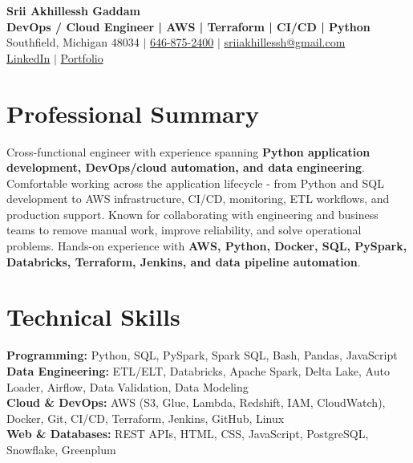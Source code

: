 \documentclass[letterpaper,10pt]{article}
\begin{document}
\fontsize{9.35pt}{10.45pt}\selectfont

\begin{center}
    {\LARGE \textbf{Srii Akhillessh Gaddam}} \\[-1pt]
    \textbf{DevOps / Cloud Engineer | AWS | Terraform | CI/CD | Python} \\[2pt]
    Southfield, Michigan 48034 $|$
    \href{tel:6468752400}{646-875-2400} $|$
    \href{mailto:sriiakhillessh@gmail.com}{sriiakhillessh@gmail.com} \\[1pt]
    \href{https://www.linkedin.com/in/srii-akhiilessh-gaddam-b48668191/}{LinkedIn} $|$
    \href{https://sriiakhillesshg.github.io/portfolio/}{Portfolio}
\end{center}
\vspace{-8pt}

\section{Professional Summary}
\small{Cross-functional engineer with experience spanning \textbf{Python application development, DevOps/cloud automation, and data engineering}. Comfortable working across the application lifecycle - from Python and SQL development to AWS infrastructure, CI/CD, monitoring, ETL workflows, and production support. Known for collaborating with engineering and business teams to remove manual work, improve reliability, and solve operational problems. Hands-on experience with \textbf{AWS, Python, Docker, SQL, PySpark, Databricks, Terraform, Jenkins, and data pipeline automation}.}

\section{Technical Skills}
\small{
\textbf{Programming:} Python, SQL, PySpark, Spark SQL, Bash, Pandas, JavaScript \\
\textbf{Data Engineering:} ETL/ELT, Databricks, Apache Spark, Delta Lake, Auto Loader, Airflow, Data Validation, Data Modeling \\
\textbf{Cloud \& DevOps:} AWS (S3, Glue, Lambda, Redshift, IAM, CloudWatch), Docker, Git, CI/CD, Terraform, Jenkins, GitHub, Linux \\
\textbf{Web \& Databases:} REST APIs, HTML, CSS, JavaScript, PostgreSQL, Snowflake, Greenplum
}
\end{document}
